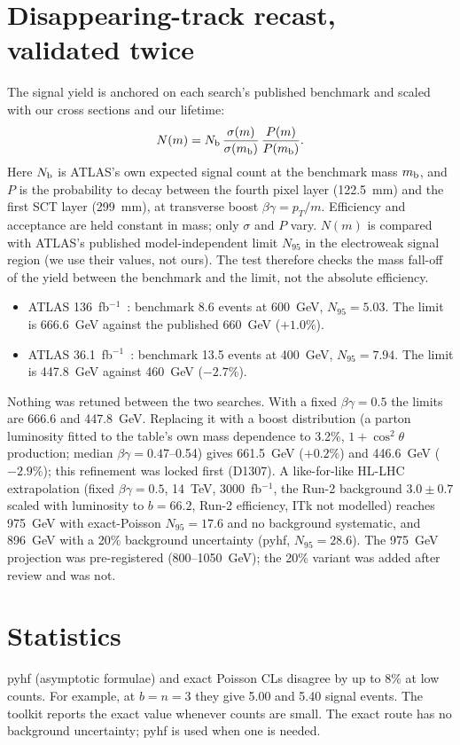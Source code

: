 \documentclass[aps,prd,twocolumn,superscriptaddress,nofootinbib,showkeys]{revtex4-2}
\begin{document}
\section{Disappearing-track recast, validated twice}
The signal yield is anchored on each search's published benchmark and scaled with our cross sections and our lifetime:
\begin{equation}
N(m)=N_{\rm b}\,\frac{\sigma(m)}{\sigma(m_{\rm b})}\,\frac{P(m)}{P(m_{\rm b})}.
\end{equation}
Here $N_{\rm b}$ is ATLAS's own expected signal count at the benchmark mass $m_{\rm b}$, and $P$ is the probability to decay between the fourth pixel layer (122.5~mm) and the first SCT layer (299~mm), at transverse boost $\beta\gamma=p_T/m$. Efficiency and acceptance are held constant in mass; only $\sigma$ and $P$ vary. $N(m)$ is compared with ATLAS's published model-independent limit $N_{95}$ in the electroweak signal region (we use their values, not ours). The test therefore checks the mass fall-off of the yield between the benchmark and the limit, not the absolute efficiency.
\begin{itemize}
\item ATLAS 136~fb$^{-1}$~\cite{AT136}: benchmark 8.6 events at 600~GeV, $N_{95}=5.03$. The limit is 666.6~GeV against the published 660~GeV ($+1.0\%$).
\item ATLAS 36.1~fb$^{-1}$~\cite{AT36}: benchmark 13.5 events at 400~GeV, $N_{95}=7.94$. The limit is 447.8~GeV against 460~GeV ($-2.7\%$).
\end{itemize}
Nothing was retuned between the two searches. With a fixed $\beta\gamma=0.5$ the limits are 666.6 and 447.8~GeV. Replacing it with a boost distribution (a parton luminosity fitted to the table's own mass dependence to 3.2\%, $1+\cos^2\theta$ production; median $\beta\gamma=0.47$--0.54) gives 661.5~GeV ($+0.2\%$) and 446.6~GeV ($-2.9\%$); this refinement was locked first (D1307). A like-for-like HL-LHC extrapolation (fixed $\beta\gamma=0.5$, 14~TeV, 3000~fb$^{-1}$, the Run-2 background $3.0\pm0.7$ scaled with luminosity to $b=66.2$, Run-2 efficiency, ITk not modelled) reaches 975~GeV with exact-Poisson $N_{95}=17.6$ and no background systematic, and 896~GeV with a 20\% background uncertainty (pyhf, $N_{95}=28.6$). The 975~GeV projection was pre-registered (800--1050~GeV); the 20\% variant was added after review and was not.

\section{Statistics}
pyhf (asymptotic formulae) and exact Poisson CLs disagree by up to 8\% at low counts. For example, at $b=n=3$ they give 5.00 and 5.40 signal events. The toolkit reports the exact value whenever counts are small. The exact route has no background uncertainty; pyhf is used when one is needed.
\end{document}
